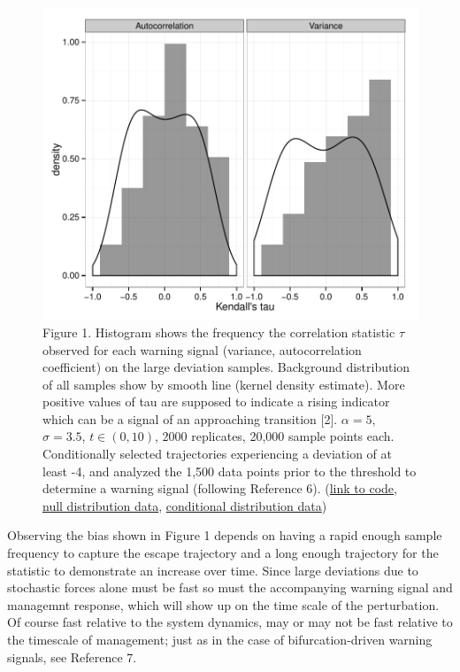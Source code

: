 \documentclass[review]{elsarticle} %
\makeatletter
\def\maxwidth{\ifdim\Gin@nat@width>\linewidth\linewidth
\else\Gin@nat@width\fi}
\let\Oldincludegraphics\includegraphics
\renewcommand{\includegraphics}[1]{\Oldincludegraphics[width=\maxwidth]{#1}}
\makeatother
\begin{document}
\begin{figure}[htbp]
\centering
\includegraphics{figure1.pdf}
\caption{Figure 1. Histogram shows the frequency the correlation
statistic $\tau$ observed for each warning signal (variance,
autocorrelation coefficient) on the large deviation samples. Background
distribution of all samples show by smooth line (kernel density
estimate). More positive values of tau are supposed to indicate a rising
indicator which can be a signal of an approaching transition {[}2{]}.
$\alpha = 5$, $\sigma=3.5$, $t \in (0, 10)$, 2000 replicates, 20,000
sample points each. Conditionally selected trajectories experiencing a
deviation of at least -4, and analyzed the 1,500 data points prior to
the threshold to determine a warning signal (following Reference 6).
(\href{https://raw.github.com/cboettig/earlywarning/7460ea94c293844d8e88c83b95e3d80004817de6/inst/examples/beer.md}{link
to code},
\href{https://raw.github.com/cboettig/earlywarning/7460ea94c293844d8e88c83b95e3d80004817de6/inst/examples/beer_nulldat.csv}{null
distribution data},
\href{https://raw.github.com/cboettig/earlywarning/7460ea94c293844d8e88c83b95e3d80004817de6/inst/examples/beer_dat.csv}{conditional
distribution data})}
\end{figure}

Observing the bias shown in Figure 1 depends on having a rapid enough
sample frequency to capture the escape trajectory and a long enough
trajectory for the statistic to demonstrate an increase over time. Since
large deviations due to stochastic forces alone must be fast so must the
accompanying warning signal and managemnt response, which will show up
on the time scale of the perturbation. Of course fast relative to the
system dynamics, may or may not be fast relative to the timescale of
management; just as in the case of bifurcation-driven warning signals,
see Reference 7.
\end{document}
